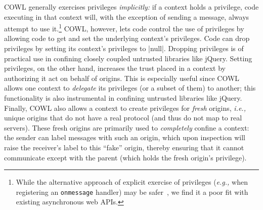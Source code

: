 COWL generally exercises privileges \emph{implicitly:} if a context
holds a privilege, code executing in that context will, with the
exception of sending a message, always attempt to use it.\footnote{
While the alternative approach of explicit exercise of privileges
(\emph{e.g.,} when registering an \texttt{onmessage} handler) may be
safer~\cite{Zeldovich:2006, stefan:2011:flexible, miller:capability},
we find it a poor fit with 
existing asynchronous web APIs.}
%
COWL, however, lets code control the use of privileges by allowing code
to get and set the underlying context's privileges.
%
Code can drop privileges by setting its context's privileges to
\js|null|.
%
Dropping privileges is of practical use in confining closely
coupled untrusted libraries like jQuery.
%
Setting privileges, on the other hand, increases the
trust placed in a context by authorizing it act on behalf of
origins.
%
This is especially useful since
COWL allows one context to {\em delegate} its privileges (or a subset
of them) to another; this functionality is also instrumental in
confining untrusted libraries like jQuery.
%
%
Finally, COWL also allows a context to create privileges for \emph{fresh}
origins, \emph{i.e.,} unique origins that do not have a real protocol
(and thus do not map to real servers).
%
These fresh origins are primarily used to \emph{completely} confine a
context: the sender can label messages with such an origin, which upon
inspection will raise the receiver's label to this ``fake'' origin,
thereby ensuring that it cannot communicate except with the parent
(which holds the fresh origin's privilege).
%
%





